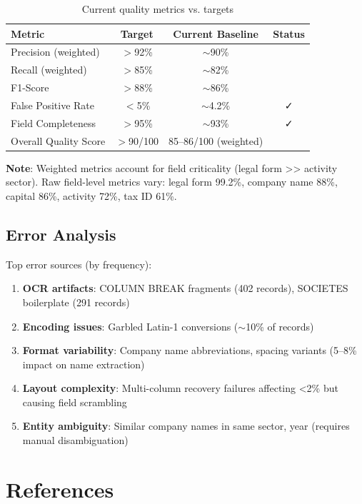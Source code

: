 \documentclass[12pt,a4paper]{report}
\begin{document}
\begin{table}[H]
\centering
\begin{tabular}{|l|c|c|c|}
\hline
\textbf{Metric} & \textbf{Target} & \textbf{Current Baseline} & \textbf{Status} \\
\hline
Precision (weighted) & $>$92\% & $\sim$90\% & 🔄 \\
Recall (weighted) & $>$85\% & $\sim$82\% & 🔄 \\
F1-Score & $>$88\% & $\sim$86\% & 🔄 \\
False Positive Rate & $<$5\% & $\sim$4.2\% & ✓ \\
Field Completeness & $>$95\% & $\sim$93\% & ✓ \\
Overall Quality Score & $>$90/100 & 85--86/100 (weighted) & 🔄 \\
\hline
\end{tabular}
\caption{Current quality metrics vs. targets}
\end{table}

\textbf{Note}: Weighted metrics account for field criticality (legal form >> activity sector). Raw field-level metrics vary: legal form 99.2\%, company name 88\%, capital 86\%, activity 72\%, tax ID 61\%.

\section{Error Analysis}

Top error sources (by frequency):
\begin{enumerate}
    \item \textbf{OCR artifacts}: COLUMN BREAK fragments (402 records), SOCIETES boilerplate (291 records)
    \item \textbf{Encoding issues}: Garbled Latin-1 conversions ($\sim$10\% of records)
    \item \textbf{Format variability}: Company name abbreviations, spacing variants (5--8\% impact on name extraction)
    \item \textbf{Layout complexity}: Multi-column recovery failures affecting <2\% but causing field scrambling
    \item \textbf{Entity ambiguity}: Similar company names in same sector, year (requires manual disambiguation)
\end{enumerate}

\chapter{References}
\end{document}
